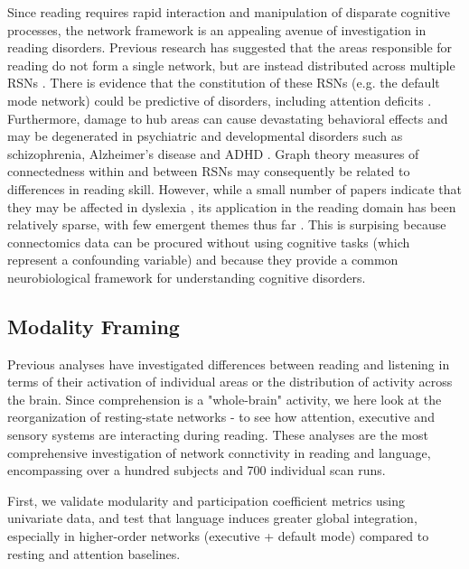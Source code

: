 Since reading requires rapid interaction and manipulation of disparate cognitive processes, the network framework is an appealing avenue of investigation in reading disorders. Previous research has suggested that the areas responsible for reading do not form a single network, but are instead distributed across multiple RSNs \cite{Vogel2013}. There is evidence that the constitution of these RSNs (e.g. the default mode network) could be predictive of disorders, including attention deficits \cite{Uddin2008}. Furthermore, damage to hub areas can cause devastating behavioral effects \cite{Warren2014} and may be degenerated in psychiatric and developmental disorders such as schizophrenia, Alzheimer's disease and ADHD \cite{Stam2014}. Graph theory measures of connectedness within and between RSNs may consequently be related to differences in reading skill. However, while a small number of papers indicate that they may be affected in dyslexia \cite{Qi2016, Finn2014}, its application in the reading domain has been relatively sparse, with few emergent themes thus far \cite{Cao2016}. This is surpising because connectomics data can be procured without using cognitive tasks (which represent a confounding variable) and because they provide a common neurobiological framework for understanding cognitive disorders.



\subsection{Modality Framing}

Previous analyses have investigated differences between reading and listening in terms of their activation of individual areas or the distribution of activity across the brain. Since comprehension is a "whole-brain" activity, we here look at the reorganization of resting-state networks - to see how attention, executive and sensory systems are interacting during reading.  These analyses are the most comprehensive investigation of network connctivity in reading and language, encompassing over a hundred subjects and 700 individual scan runs. 

First, we validate modularity and participation coefficient metrics using univariate data, and test that language induces greater global integration, especially in higher-order networks (executive + default mode) compared to resting and attention baselines.

